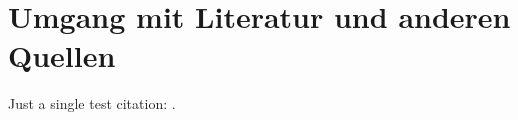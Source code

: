 \chapter[Umgang mit Literatur]{Umgang mit Literatur und anderen Quellen}
\label{cha:Literatur}


Just a single test citation: \cite{Drake1948}.


